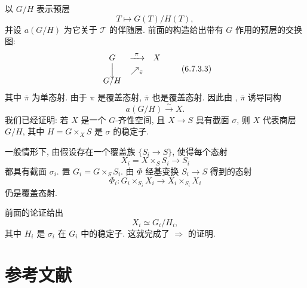 以 \(G/H\) 表示预层
\[
  T\longmapsto G(T)/H(T),
\]
并设 \(a(G/H)\) 为它关于 \(\mathcal T\) 的伴随层.
前面的构造给出带有 \(G\) 作用的预层的交换图:
\[
\begin{array}{ccccc}
  G & \xrightarrow{\ \pi\ } & X\\
  \Big\downarrow & \nearrow_{\scriptstyle\bar\pi} &\\[-0.25em]
  G/H & &
\end{array}
\tag{6.7.3.3}\label{sga3:iv:propdef:6:7:3:eq:6:7:3:3:01}
\]
其中 \(\bar\pi\) 为单态射. 由于 \(\pi\) 是覆盖态射,
\(\bar\pi\) 也是覆盖态射.
因此由 ,
\(\bar\pi\) 诱导同构
\[
  a(G/H)\xrightarrow{\sim}X.
\]
我们已经证明: 若 \(X\) 是一个 \(G\)-齐性空间,
且 \(X\to S\) 具有截面 \(\sigma\), 则 \(X\) 代表商层 \(G/H\),
其中 \(H=G\times_XS\) 是 \(\sigma\) 的稳定子.

一般情形下, 由假设存在一个覆盖族 \(\{S_i\to S\}\), 使得每个态射
\[
  X_i=X\times_SS_i\longrightarrow S_i
\]
都具有截面 \(\sigma_i\). 置 \(G_i=G\times_SS_i\).
由 \(\Phi\) 经基变换 \(S_i\to S\) 得到的态射
\[
  \Phi_i:G_i\times_{S_i}X_i\longrightarrow X_i\times_{S_i}X_i
\]
仍是覆盖态射.

前面的论证给出
\[
  X_i\simeq G_i/H_i,
\]
其中 \(H_i\) 是 \(\sigma_i\) 在 \(G_i\) 中的稳定子.
这就完成了 \(\Longrightarrow\) 的证明.

\section*{参考文献}

